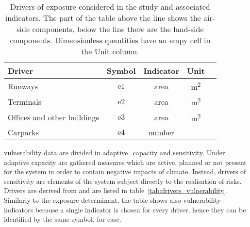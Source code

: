 \begin{table}[h]
  \renewcommand*{\arraystretch}{1.5}
  \centering
  \caption{Drivers of exposure considered in the study and associated indicators. The part of the table above the line shows the air-side components, below the line there are the land-side components. Dimensionless quantities have an empy cell in the Unit column.}
  \label{tab:drivers_exposure}
  \begin{tabular}{p{}cccc}
    Driver                      & Symbol        & Indicator & Unit                 \\
    \hline
    Runways                     & $\mathrm{e1}$ & area      & \unit{\square\metre} \\
    \hline
    Terminals                   & $\mathrm{e2}$ & area      & \unit{\square\metre} \\
    Offices and other buildings & $\mathrm{e3}$ & area      & \unit{\square\metre} \\
    Carparks                    & $\mathrm{e4}$ & number    &                      \\
  \end{tabular}
\end{table}

\Gls{vulnerability} data are divided in \gls{adaptive_capacity} and \gls{sensitivity}. Under adaptive capacity are gathered measures which are active, planned or not present for the system in order to contain negative \glspl{impact} of climate. Instead, \glspl{driver} of sensitivity are elements of the system subject directly to the realisation of risks. Drivers are derived from \cite[555-556,558]{2022DeVivoRiskAssessment} and are listed in table~\ref{tab:drivers_vulnerability}. Similarly to the \gls{exposure} \gls{determinant}, the table shows also vulnerability \glspl{indicator} because a single indicator is chosen for every driver, hence they can be identified by the same symbol, for ease.


